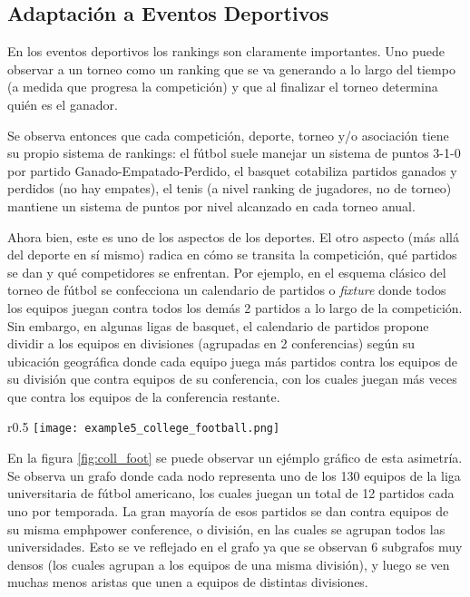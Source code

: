 \subsection{Adaptaci\'on a Eventos Deportivos}
\par En los eventos deportivos los rankings son claramente
importantes. Uno puede observar a un torneo como un ranking que se va generando
a lo largo del tiempo (a medida que progresa la competici\'on) y que al
finalizar el torneo determina quién es el ganador.

\par Se observa entonces que cada competici\'on, deporte, torneo y/o
asociaci\'on tiene su propio sistema de rankings: el f\'utbol suele manejar un
sistema de puntos 3-1-0 por partido Ganado-Empatado-Perdido, el basquet
cotabiliza partidos ganados y perdidos (no hay empates), el tenis (a nivel
ranking de jugadores, no de torneo) mantiene un sistema de puntos por nivel
alcanzado en cada torneo anual.

\par Ahora bien, este es uno de los aspectos de los deportes. El otro aspecto
(m\'as all\'a del deporte en sí mismo) radica en cómo se transita la
competici\'on, qué partidos se dan y qué competidores se enfrentan. Por ejemplo,
en el esquema cl\'asico del torneo de f\'utbol se confecciona un calendario de
partidos o \emph{fixture} donde todos los equipos juegan contra todos los
dem\'as 2 partidos a lo largo de la competici\'on. Sin embargo, en algunas ligas
de basquet, el calendario de partidos propone dividir a los equipos en
divisiones (agrupadas en 2 conferencias) seg\'un su ubicaci\'on geogr\'afica
donde cada equipo juega m\'as partidos contra los equipos de su divisi\'on que
contra equipos de su conferencia, con los cuales juegan m\'as veces que contra
los equipos de la conferencia restante.

\begin{wrapfigure}[24]{r}{0.5\textwidth}
    \centering
    \texttt{[image: example5\_college\_football.png]}
    \caption{Grafo de Encuentros de la liga de f\'utbol americano
        universitaria~\cite{college_football_graph}}
    \label{fig:coll_foot}
\end{wrapfigure}
\leavevmode

\par En la figura \ref{fig:coll_foot} se puede observar un ej\'emplo gr\'afico
de esta asimetr\'ia. Se observa un grafo donde cada nodo representa uno de los
130 equipos de la liga universitaria de f\'utbol americano, los cuales juegan un
total de 12 partidos cada uno por temporada. La gran mayor\'ia de esos partidos
se dan contra equipos de su misma emph{power conference}, o divisi\'on, en las
cuales se agrupan todos las universidades. Esto se ve reflejado en el grafo ya
que se observan 6 subgrafos muy densos (los cuales agrupan a los equipos de
una misma divisi\'on), y luego se ven muchas menos aristas que unen a equipos de
distintas divisiones.

